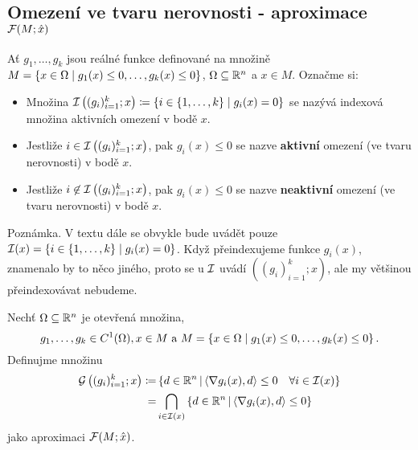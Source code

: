 \subsection{Omezení ve tvaru nerovnosti - aproximace \texorpdfstring{$\mathcal{F}(M;\hat x)$}{F(M;x)}}
Ať $g_1, \dots, g_k$ jsou reálné funkce definované na množině 
$M = \left\lbrace x \in \Omega \mid g_1(x) \leq 0, \dots, g_k(x) \leq 0 \right\rbrace$, $\Omega \subseteq \mathbb{R}^n$ a $x \in M$.
Označme si:
\begin{itemize}
    \item Množina $\mathcal{I} \left((g_i)_{i=1}^k;x\right)\coloneq \left\lbrace i \in \left\lbrace 1, \dots, k \right\rbrace \mid g_i(x) = 0 \right\rbrace$ se nazývá
    indexová množina aktivních omezení v bodě $x$.
    \item Jestliže $i \in \mathcal{I} \left((g_i)_{i=1}^k;x\right)$, pak $g_i(x) \leq 0$ se nazve \textbf{aktivní} omezení (ve
    tvaru nerovnosti) v bodě $x$.
    \item Jestliže $i \not\in \mathcal{I} \left((g_i)_{i=1}^k;x\right)$, pak $g_i(x) \leq 0$ se nazve \textbf{neaktivní} omezení
    (ve tvaru nerovnosti) v bodě $x$.
\end{itemize}
Poznámka. V textu dále se obvykle bude uvádět pouze $\mathcal{I}(x) = \left\lbrace i \in \left\lbrace 1, \dots, k \right\rbrace \mid g_i(x) = 0 \right\rbrace$. Když
přeindexujeme funkce $g_i(x)$, znamenalo by to něco jiného, proto se u $\mathcal{I}$ uvádí $\left((g_i)_{i=1}^k;x\right)$, ale my
většinou přeindexovávat nebudeme.

\vspace*{1.5em}
 Nechť $\Omega \subseteq \mathbb{R}^n$ je otevřená množina,
\[
  g_1, \dots, g_k \in C^1(\Omega), x \in M \text{ a } M = \left\lbrace x \in \Omega\mid g_1(x) \leq 0, \dots, g_k (x) \leq 0 \right\rbrace. 
\]
Definujme množinu
\begin{align*}
    \mathcal{G} \left( (g_i)_{i=1}^k; x\right) \coloneq& \left\lbrace d \in \mathbb{R}^n \, \middle| \, \langle \nabla g_i(x), 
    d \rangle \leq 0 \quad \forall i \in \mathcal{I} (x) \right\rbrace \\
    =& \bigcap_{i \in \mathcal{I}(x)} \left\lbrace d \in \mathbb{R}^n \, \middle| \, \langle \nabla g_i (x), d\rangle \leq 0 \right\rbrace
\end{align*}
jako aproximaci $\mathcal{F}(M; \hat x)$.


